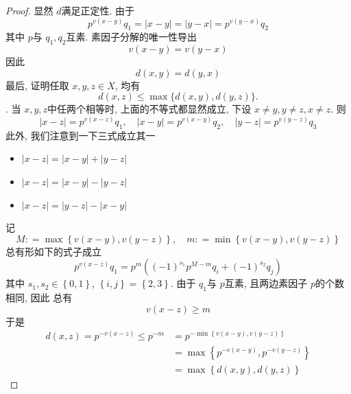 \documentclass[../main.tex]{subfiles}
\begin{document}
\begin{proof}
    显然 \(  d  \)满足正定性. 由于 \[
    p^{v\left( x-y \right) }q_1=  \left| x-y \right|= \left| y-x \right|= p^{v\left( y-x \right) }q_2 
    \]其中 \(  p  \)与 \(  q_1,q_2  \)互素.  素因子分解的唯一性导出 \[
    v\left( x-y \right)= v\left( y-x \right)  
    \] 因此 \[
    d\left( x,y \right)= d\left( y,x \right)  
    \]最后, 证明任取 \(  x,y,z \in X  \), 均有 \[ d(x, z) \le \max\{d(x, y), d(y, z)\}. \]. 当 \(  x,y,z  \)中任两个相等时, 上面的不等式都显然成立, 下设 \(  x \neq y, y\neq z, x \neq z  \).    则   \[
    \left| x-z \right|= p^{v\left( x-z \right) }q_1,\quad \left| x-y \right|= p^{v\left( x-y \right) }q_2,\quad \left| y-z \right|= p^{v\left( y-z \right) }q_3   
    \] 此外, 我们注意到一下三式成立其一
    \begin{itemize}
        \item \(  \left| x-z \right|= \left| x-y \right|+ \left| y-z \right|     \)
        \item \(  \left| x-z \right|= \left| x-y \right|-\left| y-z \right|     \)  
        \item \(  \left| x-z \right|= \left| y-z \right|-\left| x-y \right|     \) 
    \end{itemize}
    记 \[
    M: = \max \left\{ v\left( x-y \right), v\left( y-z \right)   \right\},\quad m: = \min \left\{ v\left( x-y \right),v\left( y-z \right)   \right\}
    \]
  总有形如下的式子成立 \[
    p^{v\left( x-z \right) }q_1= p^{m}\left( \left( -1 \right)^{s_1} p^{M-m}q_{i}+ \left( -1 \right)^{s_2}  q_{j} \right) 
    \]其中 \(  s_1,s_2 \in \left\{ 0,1 \right\} \), \(  \left\{ i,j \right\}= \left\{ 2,3 \right\}  \). 由于 \(  q_1  \)与 \(  p  \)互素, 且两边素因子 \(  p  \)的个数相同, 因此 总有 \[
    v\left( x-z \right)\ge m 
    \]  
   于是 \[
    \begin{aligned}
    d\left( x,z \right)= p^{-v\left( x-z \right) }\le  p^{-m}&= p^{-\min \left\{ v\left( x-y \right),v\left( y-z \right)   \right\}} \\ 
     &= \max \left\{ p^{-v\left( x-y \right) },p^{-v\left( y-z \right) } \right\}\\ 
      &= \max \left\{ d\left( x,y \right),d\left( y,z \right)   \right\}
    \end{aligned} 
    \]
\end{proof}
\end{document}
